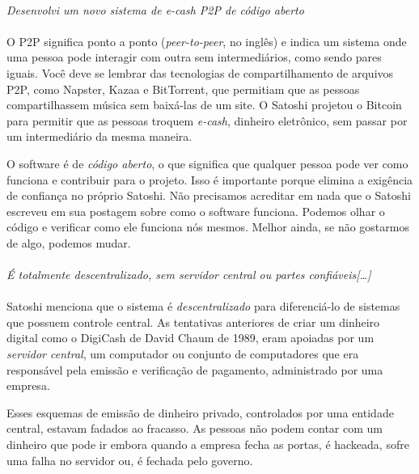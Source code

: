 \paragraph{}
\textit{Desenvolvi um novo sistema de e-cash P2P de código aberto}
\paragraph{}

O P2P significa ponto a ponto (\textit{peer-to-peer}, no inglês) e indica um sistema onde uma pessoa pode interagir com outra sem intermediários, como sendo pares iguais. Você deve se lembrar das tecnologias de compartilhamento de arquivos P2P, como Napster, Kazaa e BitTorrent, que permitiam que as pessoas compartilhassem música sem baixá-las de um site. O Satoshi projetou o Bitcoin para permitir que as pessoas troquem \textit{e-cash}, dinheiro eletrônico, sem passar por um intermediário da mesma maneira.

O software é de \textit{código aberto}, o que significa que qualquer pessoa pode ver como funciona e contribuir para o projeto. Isso é importante porque elimina a exigência de confiança no próprio Satoshi. Não precisamos acreditar em nada que o Satoshi escreveu em sua postagem sobre como o software funciona. Podemos olhar o código e verificar como ele funciona nós mesmos. Melhor ainda, se não gostarmos de algo, podemos mudar.

\paragraph{}
\textit{É totalmente descentralizado, sem servidor central ou partes confiáveis[\ldots]}
\paragraph{}

Satoshi menciona que o sistema é \textit{descentralizado} para diferenciá-lo de sistemas que possuem controle central. As tentativas anteriores de criar um dinheiro digital como o DigiCash de David Chaum de 1989, eram apoiadas por um \textit{servidor central}, um computador ou conjunto de computadores que era responsável pela emissão e verificação de pagamento, administrado por uma empresa.

Esses esquemas de emissão de dinheiro privado, controlados por uma entidade central, estavam fadados ao fracasso. As pessoas não podem contar com um dinheiro que pode ir embora quando a empresa fecha as portas, é hackeada, sofre uma falha no servidor ou, é fechada pelo governo.

